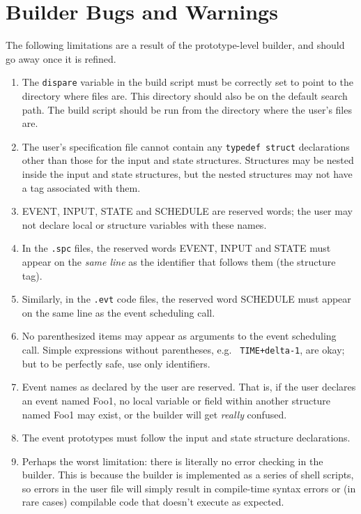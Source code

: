 \chapter{Builder Bugs and Warnings}
\label{syntax}

The following limitations are a result of the prototype-level
builder, and should go away once it is refined.

\begin{enumerate}

\item The {\tt dispare} variable in the build script must be correctly
set to point to the directory where \dispare files are.  This directory
should also be on the default search path.  The build script should be
run from the directory where the user's files are.

\item The user's specification file cannot contain any {\tt typedef
struct} declarations other than those for the input and state
structures.  Structures may be nested inside the input and state
structures, but the nested structures may not have a tag associated with
them. 

\item EVENT, INPUT, STATE and SCHEDULE are reserved words; the user may
not declare local or structure variables with these names.

\item In the {\tt .spc} files, the reserved words EVENT, INPUT and STATE
must appear on the {\em same line} as the identifier that follows them
(the structure tag).

\item Similarly, in the {\tt .evt} code files, the reserved word
SCHEDULE must appear on the same line as the event scheduling call.

\item No parenthesized items may appear as arguments to the event
scheduling call.  Simple expressions without parentheses, e.g. {\tt
TIME+delta-1}, are okay; but to be perfectly safe, use only identifiers.

\item Event names as declared by the user are reserved.  That is, if the
user declares an event named Foo1, no local variable or field within
another structure named Foo1 may exist, or the builder will get
{\em really} confused.

\item The event prototypes must follow the input and state structure
declarations.

\item Perhaps the worst limitation: there is literally no error checking
in the builder.  This is because the builder is implemented as a
series of shell scripts, so errors in the user file will simply result
in compile-time syntax errors or (in rare cases) compilable code that
doesn't execute as expected.
\end{enumerate}


